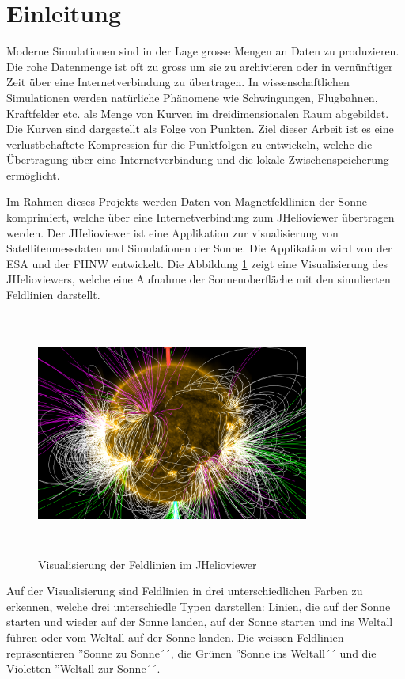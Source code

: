 \section{Einleitung}\label{einleitung}
Moderne Simulationen sind in der Lage grosse Mengen an Daten zu produzieren. Die rohe Datenmenge ist oft zu gross um sie zu archivieren oder in vernünftiger Zeit über eine Internetverbindung zu übertragen. In wissenschaftlichen Simulationen werden natürliche Phänomene wie Schwingungen, Flugbahnen, Kraftfelder etc. als Menge von Kurven im dreidimensionalen Raum abgebildet. Die Kurven sind dargestellt als Folge von Punkten. Ziel dieser Arbeit ist es eine verlustbehaftete Kompression für die Punktfolgen zu entwickeln, welche die Übertragung über eine Internetverbindung und die lokale Zwischenspeicherung ermöglicht.

Im Rahmen dieses Projekts werden Daten von Magnetfeldlinien der Sonne komprimiert, welche über eine Internetverbindung zum JHelioviewer übertragen werden. Der JHelioviewer ist eine Applikation zur visualisierung von Satellitenmessdaten und Simulationen der Sonne. Die Applikation wird von der ESA und der FHNW entwickelt. Die Abbildung \ref{einleitung::feldlinien} zeigt eine Visualisierung des JHelioviewers, welche eine Aufnahme der Sonnenoberfläche mit den simulierten Feldlinien darstellt.

\begin{figure}[!htbp]
\center
	\includegraphics[width=0.8\textwidth,height=8cm,keepaspectratio]{./pictures/einleitung/fieldLines.png}
	\caption{Visualisierung der Feldlinien im JHelioviewer}
	\label{einleitung::feldlinien}
\end{figure}
Auf der Visualisierung sind Feldlinien in drei unterschiedlichen Farben zu erkennen, welche drei unterschiedle Typen darstellen: Linien, die auf der Sonne starten und wieder auf der Sonne landen, auf der Sonne starten und ins Weltall führen oder vom Weltall auf der Sonne landen. Die weissen Feldlinien repräsentieren ''Sonne zu Sonne´´, die Grünen ''Sonne ins Weltall´´ und die Violetten ''Weltall zur Sonne´´.

